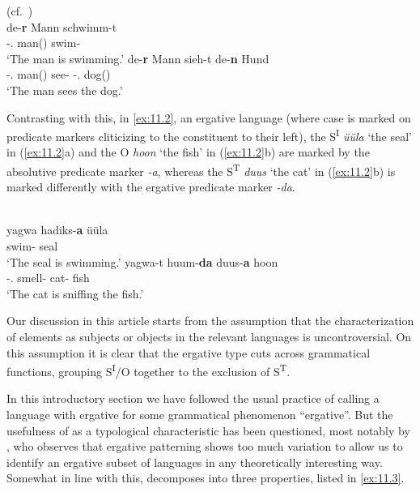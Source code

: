\documentclass[output=paper]{langsci/langscibook}
\begin{document}
\ea%
    \label{ex:11.1} ({cf.\ \citealt{Curme1952}})\\
	\ea
		\gll de-\textbf{r}        Mann    schwimm-t\\
			\Det-\M.\Nom{}  man(\M)  swim-\Tsg{}\\
		\glt ‘The man is swimming.’
	\ex
		\gll de-\textbf{r}        Mann    sieh-t  de-\textbf{n}      Hund\\
			\Det-\M.\Nom{}  man(\M)  see-\Tsg{} \Det-\glossN.\Acc{}  dog(\glossN)\\
		\glt ‘The man sees the dog.’
	\z
\z

Contrasting with this, in  \eqref{ex:11.2}, an
ergative language (where case is marked on predicate markers cliticizing to the
constituent to their left), the S\textsuperscript{I} \emph{üüla} ‘the seal’ in
(\ref{ex:11.2}a) and the O \emph{hoon} ‘the fish’ in (\ref{ex:11.2}b)
are marked by the absolutive predicate marker \emph{-a}, whereas the
S\textsuperscript{T} \emph{duus} ‘the cat’ in (\ref{ex:11.2}b) is marked
differently with the ergative predicate marker \emph{-da}.

\ea%
    \label{ex:11.2} {\parencite[32]{Mulder1994}}\\
	\ea
		\gll yagwa  hadiks-\textbf{a}    üüla\\
			\Prs{}    swim-\Abs{}    seal\\
		\glt ‘The seal is swimming.’
	\ex
		\gll yagwa-t    huum-\textbf{da}    duus-\textbf{a}    hoon\\
			\Prs{}-\Tsg.\Sbj{}  smell-\Erg{}    cat-\Abs{}    fish\\
		\glt ‘The cat is sniffing the fish.’
	\z
\z

Our discussion in this article starts from the assumption that the
characterization of elements as subjects or objects in the relevant languages
is uncontroversial. On this assumption it is clear that the ergative 
type cuts across grammatical functions, grouping S\textsuperscript{I}/O
together to the exclusion of S\textsuperscript{T}.

In this introductory section we have followed the usual practice of calling a
language with ergative  for some grammatical phenomenon \enquote{ergative}.
But the usefulness of  as a typological characteristic has been
questioned, most notably by \citet{DeLancey2004}, who observes that ergative
patterning shows too much variation to allow us to identify an ergative subset
of languages in any theoretically interesting way. Somewhat in line with this,
\citet{Deal2015} decomposes  into three  properties, listed
in \eqref{ex:11.3}.
\end{document}
